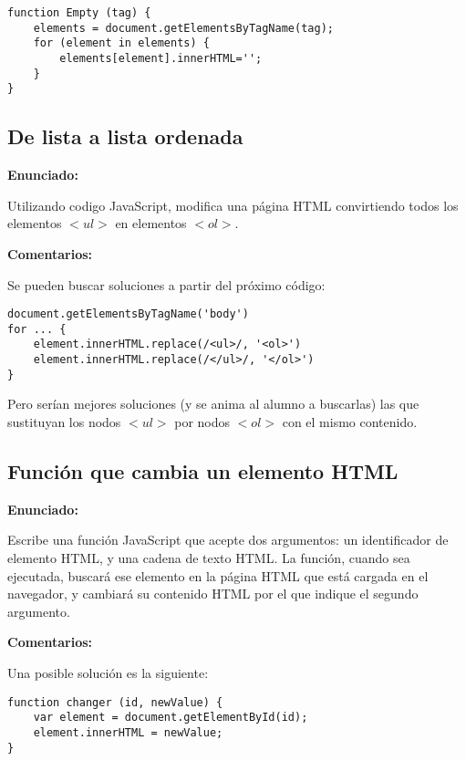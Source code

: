 \begin{verbatim}
function Empty (tag) {
    elements = document.getElementsByTagName(tag);
    for (element in elements) {
        elements[element].innerHTML='';
    }
}
\end{verbatim}


\subsection{De lista a lista ordenada}
\label{subsec:eje-js-lista-ordenada}

\textbf{Enunciado:}

Utilizando codigo JavaScript, modifica una página HTML convirtiendo todos los elementos $<ul>$ en elementos $<ol>$.

\textbf{Comentarios:}

Se pueden buscar soluciones a partir del próximo código:

\begin{verbatim}
document.getElementsByTagName('body')
for ... {
    element.innerHTML.replace(/<ul>/, '<ol>')
    element.innerHTML.replace(/</ul>/, '</ol>')
}
\end{verbatim}

Pero serían mejores soluciones (y se anima al alumno a buscarlas) las que sustituyan los nodos $<ul>$ por nodos $<ol>$ con el mismo contenido.

\subsection{Función que cambia un elemento HTML}
\label{subsec:eje-js-cambia-elemento}

\textbf{Enunciado:}

Escribe una función JavaScript que acepte dos argumentos: un identificador de elemento HTML, y una cadena de texto HTML. La función, cuando sea ejecutada, buscará ese elemento en la página HTML que está cargada en el navegador, y cambiará su contenido HTML por el que indique el segundo argumento.

\textbf{Comentarios:}

Una posible solución es la siguiente:

\begin{verbatim}
function changer (id, newValue) {
    var element = document.getElementById(id);
    element.innerHTML = newValue;
}
\end{verbatim}

